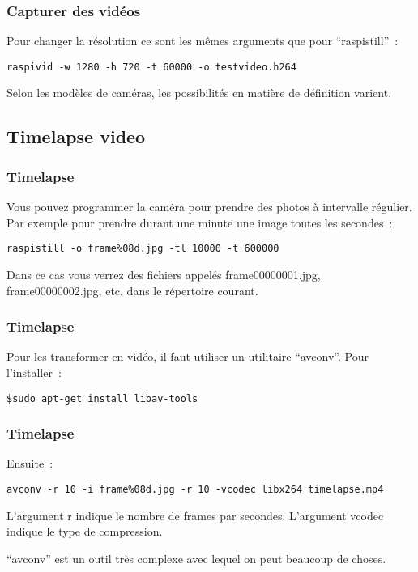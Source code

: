 \begin{frame}[containsverbatim]
\frametitle{Capturer des vidéos}

Pour changer la résolution ce sont les mêmes arguments que pour ``raspistill''~:

\begin{verbatim}
raspivid -w 1280 -h 720 -t 60000 -o testvideo.h264
\end{verbatim}

Selon les modèles de caméras, les possibilités en matière de définition varient.

\end{frame}

\subsection{Timelapse video}

\begin{frame}[containsverbatim]
\frametitle{Timelapse}

Vous pouvez programmer la caméra pour prendre des photos à intervalle régulier. Par exemple pour prendre durant une minute une image toutes les secondes~:
\begin{verbatim}
raspistill -o frame%08d.jpg -tl 10000 -t 600000
\end{verbatim}

Dans ce cas vous verrez des fichiers appelés frame00000001.jpg, frame00000002.jpg, etc. dans le répertoire courant.

\end{frame}

\begin{frame}[containsverbatim]
\frametitle{Timelapse}

Pour les transformer en vidéo, il faut utiliser un utilitaire ``avconv''. Pour l'installer~:

\begin{verbatim}
$sudo apt-get install libav-tools
\end{verbatim}

\end{frame}

\begin{frame}[containsverbatim]
\frametitle{Timelapse}

Ensuite~:

\begin{verbatim}
avconv -r 10 -i frame%08d.jpg -r 10 -vcodec libx264 timelapse.mp4
\end{verbatim}

L'argument r indique le nombre de frames par secondes. L'argument vcodec indique le type de compression.

``avconv'' est un outil très complexe avec lequel on peut beaucoup de choses.

\end{frame}